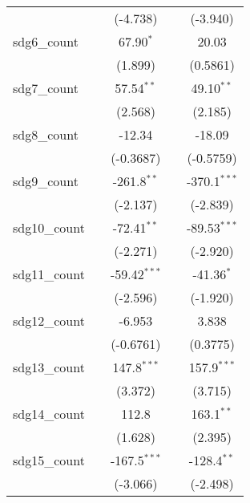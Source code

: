 \begin{tabular}{lcccc}
                     &                & (-4.738)       &                & (-3.940)\\   
   sdg6\_count       &                & 67.90$^{*}$    &                & 20.03\\   
                     &                & (1.899)        &                & (0.5861)\\   
   sdg7\_count       &                & 57.54$^{**}$   &                & 49.10$^{**}$\\   
                     &                & (2.568)        &                & (2.185)\\   
   sdg8\_count       &                & -12.34         &                & -18.09\\   
                     &                & (-0.3687)      &                & (-0.5759)\\   
   sdg9\_count       &                & -261.8$^{**}$  &                & -370.1$^{***}$\\   
                     &                & (-2.137)       &                & (-2.839)\\   
   sdg10\_count      &                & -72.41$^{**}$  &                & -89.53$^{***}$\\   
                     &                & (-2.271)       &                & (-2.920)\\   
   sdg11\_count      &                & -59.42$^{***}$ &                & -41.36$^{*}$\\   
                     &                & (-2.596)       &                & (-1.920)\\   
   sdg12\_count      &                & -6.953         &                & 3.838\\   
                     &                & (-0.6761)      &                & (0.3775)\\   
   sdg13\_count      &                & 147.8$^{***}$  &                & 157.9$^{***}$\\   
                     &                & (3.372)        &                & (3.715)\\   
   sdg14\_count      &                & 112.8          &                & 163.1$^{**}$\\   
                     &                & (1.628)        &                & (2.395)\\   
   sdg15\_count      &                & -167.5$^{***}$ &                & -128.4$^{**}$\\   
                     &                & (-3.066)       &                & (-2.498)\\   

\end{tabular}
